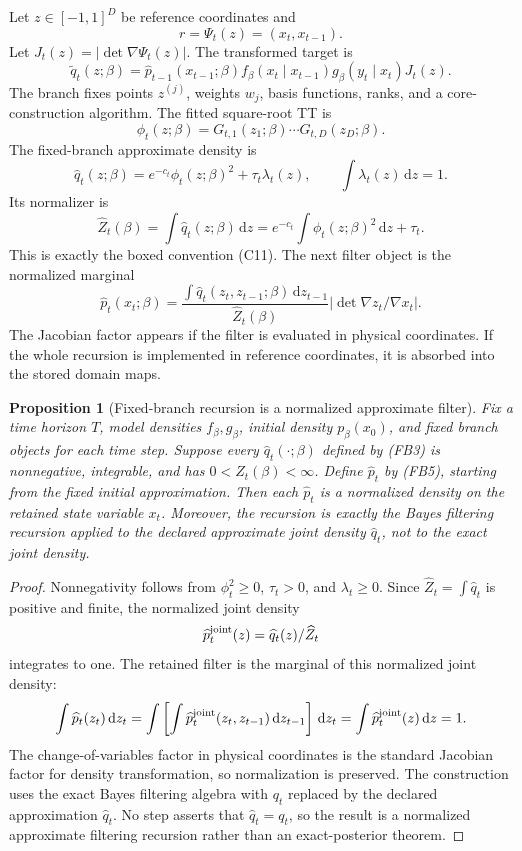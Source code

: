\documentclass[11pt]{article}
\newtheorem{proposition}{Proposition}
\newcommand{\dd}{\,\mathrm d}
\begin{document}
Let \(z\in[-1,1]^D\) be reference coordinates and
\[
    r=\Psi_t(z)=(x_t,x_{t-1}).
\]
Let \(J_t(z)=|\det\nabla\Psi_t(z)|\).  The transformed target is
\[
    \widetilde q_t(z;\beta)
    =
    \widehat p_{t-1}(x_{t-1};\beta)
    f_\beta(x_t\mid x_{t-1})
    g_\beta(y_t\mid x_t)
    J_t(z).
    \tag{FB1}
\]
The branch fixes points \(z^{(j)}\), weights \(w_j\), basis functions, ranks,
and a core-construction algorithm.  The fitted square-root TT is
\[
    \phi_t(z;\beta)=G_{t,1}(z_1;\beta)\cdots G_{t,D}(z_D;\beta).
    \tag{FB2}
\]
The fixed-branch approximate density is
\[
    \widehat q_t(z;\beta)
    =
    e^{-c_t}\phi_t(z;\beta)^2+\tau_t\lambda_t(z),
    \qquad
    \int\lambda_t(z)\dd z=1.
    \tag{FB3}
\]
Its normalizer is
\[
    \widehat Z_t(\beta)
    =
    \int\widehat q_t(z;\beta)\dd z
    =
    e^{-c_t}\int\phi_t(z;\beta)^2\dd z+\tau_t.
    \tag{FB4}
\]
This is exactly the boxed convention (C11).
The next filter object is the normalized marginal
\[
    \widehat p_t(x_t;\beta)
    =
    \frac{
    \int \widehat q_t(z_t,z_{t-1};\beta)\dd z_{t-1}}
    {\widehat Z_t(\beta)}
    \left|\det\nabla z_t/\nabla x_t\right|.
    \tag{FB5}
\]
The Jacobian factor appears if the filter is evaluated in physical coordinates.
If the whole recursion is implemented in reference coordinates, it is absorbed
into the stored domain maps.

\begin{proposition}[Fixed-branch recursion is a normalized approximate filter]
Fix a time horizon \(T\), model densities \(f_\beta,g_\beta\), initial density
\(p_\beta(x_0)\), and fixed branch objects for each time step.  Suppose every
\(\widehat q_t(\cdot;\beta)\) defined by (FB3) is nonnegative, integrable, and
has \(0<\widehat Z_t(\beta)<\infty\).  Define \(\widehat p_t\) by (FB5),
starting from the fixed initial approximation.  Then each \(\widehat p_t\) is a
normalized density on the retained state variable \(x_t\).  Moreover, the
recursion is exactly the Bayes filtering recursion applied to the declared
approximate joint density \(\widehat q_t\), not to the exact joint density.
\end{proposition}

\begin{proof}
Nonnegativity follows from
\(\phi_t^2\ge0\), \(\tau_t>0\), and \(\lambda_t\ge0\).  Since
\(\widehat Z_t=\int\widehat q_t\) is positive and finite, the normalized joint
density
\[
    \widehat p_t^{\rm joint}(z)
    =
    \widehat q_t(z)/\widehat Z_t
\]
integrates to one.  The retained filter is the marginal of this normalized
joint density:
\[
    \int \widehat p_t(z_t)\dd z_t
    =
    \int
    \left[
    \int \widehat p_t^{\rm joint}(z_t,z_{t-1})\dd z_{t-1}
    \right]\dd z_t
    =
    \int \widehat p_t^{\rm joint}(z)\dd z
    =
    1.
\]
The change-of-variables factor in physical coordinates is the standard
Jacobian factor for density transformation, so normalization is preserved.  The
construction uses the exact Bayes filtering algebra with \(q_t\) replaced by
the declared approximation \(\widehat q_t\).  No step asserts that
\(\widehat q_t=q_t\), so the result is a normalized approximate filtering
recursion rather than an exact-posterior theorem.
\end{proof}
\end{document}
